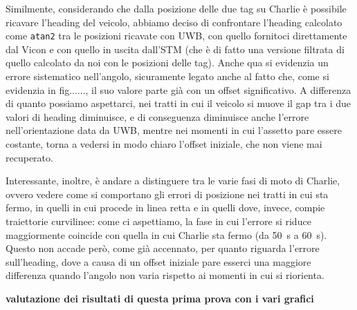 Similmente, considerando che dalla posizione delle due tag su Charlie è possibile ricavare l'heading del veicolo, abbiamo deciso di confrontare l'heading calcolato
come \verb|atan2| tra le posizioni ricavate con UWB, con quello fornitoci direttamente dal Vicon e con quello in uscita dall'STM 
(che è di fatto una versione filtrata di quello calcolato da noi con le posizioni delle tag). Anche qua si evidenzia un errore sistematico nell'angolo, sicuramente legato anche al fatto che, come si evidenzia in fig......, il suo valore parte già con un offset significativo. 
A differenza di quanto possiamo aspettarci, nei tratti in cui il veicolo si muove il gap tra i due valori di heading diminuisce, e di conseguenza diminuisce anche l'errore nell'orientazione data da UWB, mentre nei momenti in cui 
l'assetto pare essere costante, torna a vedersi in modo chiaro l'offset iniziale, che non viene mai recuperato.

\vspace{0.5cm}
Interessante, inoltre, è andare a distinguere tra le varie fasi di moto di Charlie, ovvero vedere come si comportano gli errori di posizione nei tratti in cui sta fermo, in quelli in cui procede in linea retta e in
quelli dove, invece, compie traiettorie curvilinee: come ci aspettiamo, la fase in cui l'errore si riduce 
maggiormente coincide con quella in cui Charlie sta fermo (da \SI{50}{\second} a \SI{60}{\second}). Questo non accade però, come già accennato, per quanto riguarda l'errore  sull'heading, 
dove a causa di un offset iniziale pare esserci una maggiore differenza quando l'angolo non varia rispetto ai momenti in cui si riorienta.

\textbf{valutazione dei risultati di questa prima prova con i vari grafici}

